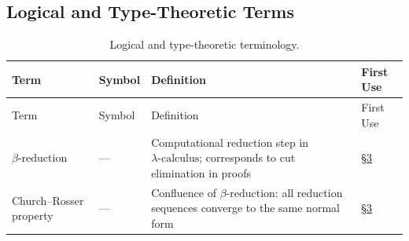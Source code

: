 \documentclass[
]{article}
\begin{document}
\subsection{Logical and Type-Theoretic
Terms}\label{sec:notation-logical}

\begin{longtable}[]{@{}
  >{\raggedright\arraybackslash}p{}
  >{\centering\arraybackslash}p{}
  >{\raggedright\arraybackslash}p{}
  >{\centering\arraybackslash}p{}@{}}
\caption{Logical and type-theoretic
terminology.}\label{tbl:not-logical}\tabularnewline
\toprule\noalign{}
\begin{minipage}[b]{\linewidth}\raggedright
Term
\end{minipage} & \begin{minipage}[b]{\linewidth}\centering
Symbol
\end{minipage} & \begin{minipage}[b]{\linewidth}\raggedright
Definition
\end{minipage} & \begin{minipage}[b]{\linewidth}\centering
First Use
\end{minipage} \\
\midrule\noalign{}
\endfirsthead
\toprule\noalign{}
\begin{minipage}[b]{\linewidth}\raggedright
Term
\end{minipage} & \begin{minipage}[b]{\linewidth}\centering
Symbol
\end{minipage} & \begin{minipage}[b]{\linewidth}\raggedright
Definition
\end{minipage} & \begin{minipage}[b]{\linewidth}\centering
First Use
\end{minipage} \\
\midrule\noalign{}
\endhead
\bottomrule\noalign{}
\endlastfoot
\(\beta\text{-reduction}\) & --- & Computational reduction step in
\(\lambda\text{-calculus}\); corresponds to cut elimination in proofs &
\href{03_categorial_grammar.md\#sec:categorial-grammar}{§3} \\
Church--Rosser property & --- & Confluence of
\(\beta\text{-reduction}\): all reduction sequences converge to the same
normal form &
\href{03_categorial_grammar.md\#sec:categorial-grammar}{§3} \\

\end{longtable}
\end{document}
